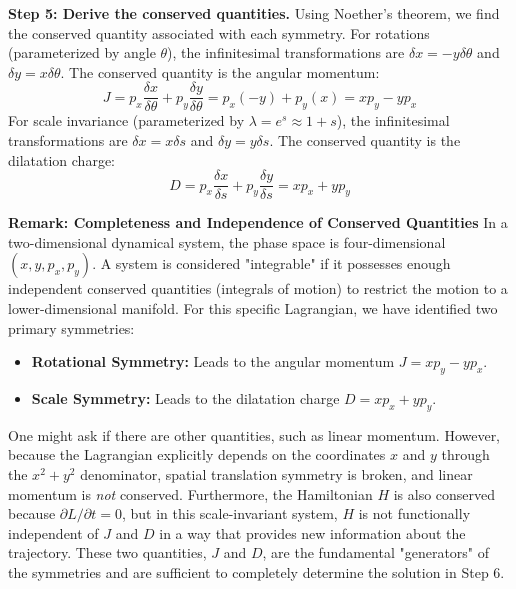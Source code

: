 \begin{solution}
\textbf{Step 5: Derive the conserved quantities.}
Using Noether's theorem, we find the conserved quantity associated with each symmetry.
For rotations (parameterized by angle $\theta$), the infinitesimal transformations are $\delta x = -y \delta\theta$ and $\delta y = x \delta\theta$. The conserved quantity is the angular momentum:
\begin{equation*}
    J = p_x \frac{\delta x}{\delta \theta} + p_y \frac{\delta y}{\delta \theta} = p_x (-y) + p_y (x) = x p_y - y p_x
\end{equation*}
For scale invariance (parameterized by $\lambda = e^s \approx 1+s$), the infinitesimal transformations are $\delta x = x \delta s$ and $\delta y = y \delta s$. The conserved quantity is the dilatation charge:
\begin{equation*}
    D = p_x \frac{\delta x}{\delta s} + p_y \frac{\delta y}{\delta s} = x p_x + y p_y
\end{equation*}

\textbf{Remark: Completeness and Independence of Conserved Quantities}
In a two-dimensional dynamical system, the phase space is four-dimensional $(x, y, p_x, p_y)$. A system is considered "integrable" if it possesses enough independent conserved quantities (integrals of motion) to restrict the motion to a lower-dimensional manifold. For this specific Lagrangian, we have identified two primary symmetries:
\begin{itemize}
    \item \textbf{Rotational Symmetry:} Leads to the angular momentum $J = x p_y - y p_x$.
    \item \textbf{Scale Symmetry:} Leads to the dilatation charge $D = x p_x + y p_y$.
\end{itemize}
One might ask if there are other quantities, such as linear momentum. However, because the Lagrangian explicitly depends on the coordinates $x$ and $y$ through the $x^2+y^2$ denominator, spatial translation symmetry is broken, and linear momentum is \textit{not} conserved. Furthermore, the Hamiltonian $H$ is also conserved because $\partial L / \partial t = 0$, but in this scale-invariant system, $H$ is not functionally independent of $J$ and $D$ in a way that provides new information about the trajectory. These two quantities, $J$ and $D$, are the fundamental "generators" of the symmetries and are sufficient to completely determine the solution in Step 6.


\end{solution}
